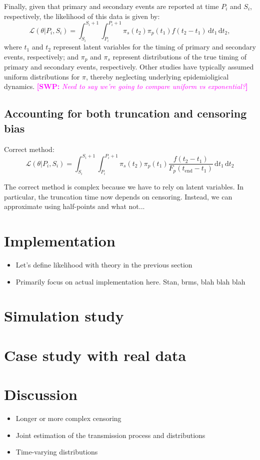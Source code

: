\documentclass[12pt]{article}
\newcommand{\comment}{\showcomment}
\newcommand{\showcomment}[3]{\textcolor{#1}{\textbf{[#2: }\textsl{#3}\textbf{]}}}
\newcommand{\swp}[1]{\comment{magenta}{SWP}{#1}}
\newcommand{\dd}[1]{\ensuremath{\, \mathrm{d}#1}}
\newcommand{\tend}{{t_{\mathrm{end}}}}
\begin{document}
Finally, given that primary and secondary events are reported at time $P_i$ and $S_i$, respectively, the likelihood of this data is given by:
\begin{equation}
\mathcal L(\theta|P_i, S_i) = \int_{S_i}^{S_i+1} \int_{P_i}^{P_i+1} \pi_s(t_2) \pi_p(t_1) f(t_2-t_1) \dd t_1 \dd t_2,
\end{equation}
where $t_1$ and $t_2$ represent latent variables for the timing of primary and secondary events, respectively;
and $\pi_p$ and $\pi_s$ represent distributions of the true timing of primary and secondary events, respectively.
Other studies have typically assumed uniform distributions for $\pi$, thereby neglecting underlying epidemioligical dynamics.
\swp{Need to say we're going to compare uniform vs exponential?}

\subsection{Accounting for both truncation and censoring bias}

Correct method:
\begin{equation}
\mathcal L(\theta|P_i, S_i) = \int_{S_i}^{S_i+1} \int_{P_i}^{P_i+1} \pi_s(t_2) \pi_p(t_1) \frac{f(t_2 - t_1)}{F_p(\tend-t_1)} \dd t_1 \dd t_2
\end{equation}

The correct method is complex because we have to rely on latent variables. In particular, the truncation time now depends on censoring. Instead, we can approximate using half-points and what not...

\section{Implementation}

\begin{itemize}
  \item Let's define likelihood with theory in the previous section
  \item Primarily focus on actual implementation here. Stan, brms, blah blah blah
\end{itemize}

\section{Simulation study}

\section{Case study with real data}

\section{Discussion}

\begin{itemize}
	\item Longer or more complex censoring
	\item Joint estimation of the transmission process and distributions
	\item Time-varying distributions
\end{itemize}	

\pagebreak


\end{document}
